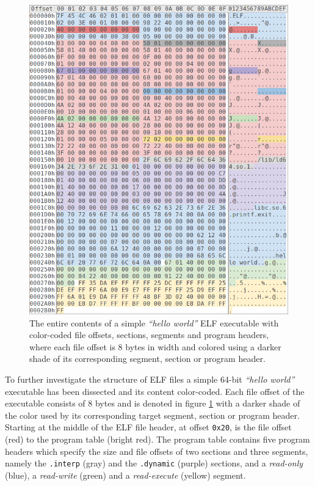\begin{figure}[htbp]
	\begin{center}
		\includegraphics[width=\textwidth]{inc/elf_dissection.png}
		\caption{The entire contents of a simple \textit{``hello world''} ELF executable with color-coded file offsets, sections, segments and program headers, where each file offset is 8 bytes in width and colored using a darker shade of its corresponding segment, section or program header.}
		\label{fig:elf_dissection}
	\end{center}
\end{figure}

To further investigate the structure of ELF files a simple 64-bit \textit{``hello world''} executable has been dissected and its content color-coded. Each file offset of the executable consists of 8 bytes and is denoted in figure \ref{fig:elf_dissection} with a darker shade of the color used by its corresponding target segment, section or program header. Starting at the middle of the ELF file header, at offset \texttt{0x20}, is the file offset (red) to the program table (bright red). The program table contains five program headers which specify the size and file offsets of two sections and three segments, namely the \texttt{.interp} (gray) and the \texttt{.dynamic} (purple) sections, and a \textit{read-only} (blue), a \textit{read-write} (green) and a \textit{read-execute} (yellow) segment.

